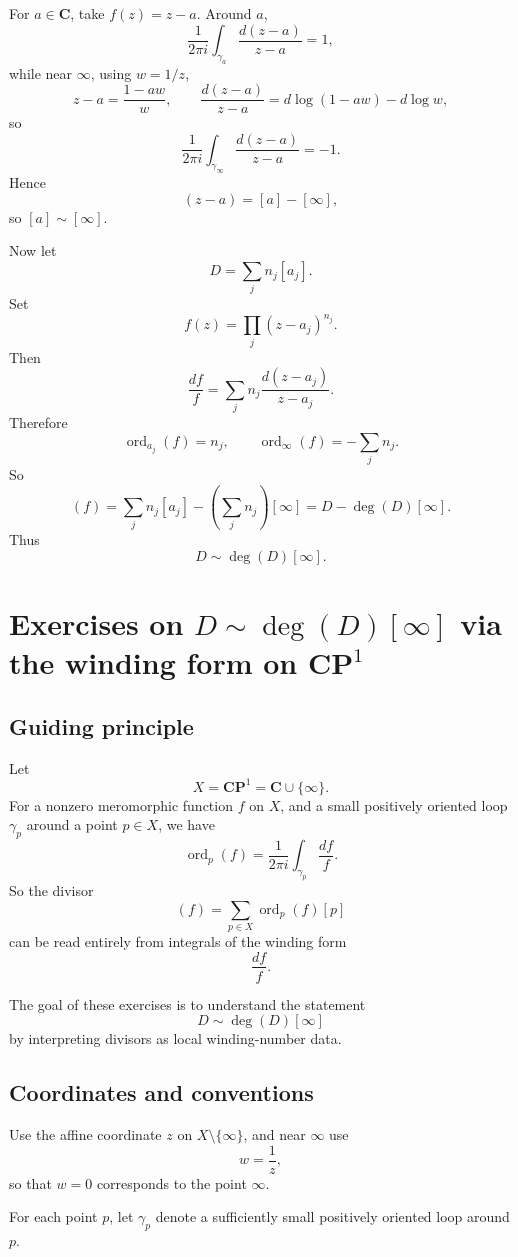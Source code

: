 \documentclass[11pt]{article}
\begin{document}
	For $a\in \mathbf{C}$, take $f(z)=z-a$. Around $a$,
	\[
	\frac{1}{2\pi i}\int_{\gamma_a}\frac{d(z-a)}{z-a}=1,
	\]
	while near $\infty$, using $w=1/z$,
	\[
	z-a=\frac{1-aw}{w},
	\qquad
	\frac{d(z-a)}{z-a}=d\log(1-aw)-d\log w,
	\]
	so
	\[
	\frac{1}{2\pi i}\int_{\gamma_\infty}\frac{d(z-a)}{z-a}=-1.
	\]
	Hence
	\[
	(z-a)=[a]-[\infty],
	\]
	so $[a]\sim [\infty]$.
	
	Now let
	\[
	D=\sum_j n_j[a_j].
	\]
	Set
	\[
	f(z)=\prod_j (z-a_j)^{n_j}.
	\]
	Then
	\[
	\frac{df}{f}=\sum_j n_j\frac{d(z-a_j)}{z-a_j}.
	\]
	Therefore
	\[
	\operatorname{ord}_{a_j}(f)=n_j,
	\qquad
	\operatorname{ord}_\infty(f)=-\sum_j n_j.
	\]
	So
	\[
	(f)=\sum_j n_j[a_j]-\left(\sum_j n_j\right)[\infty]
	= D-\deg(D)[\infty].
	\]
	Thus
	\[
	D\sim \deg(D)[\infty].
	\]
	
	\newpage
	\section*{Exercises on \texorpdfstring{$D\sim \deg(D)[\infty]$}{D~deg(D)[infinity]} via the winding form on \texorpdfstring{$\mathbf{CP}^1$}{CP1}}
	
	\subsection*{Guiding principle}
	
	Let
	\[
	X=\mathbf{CP}^1=\mathbf{C}\cup\{\infty\}.
	\]
	For a nonzero meromorphic function \(f\) on \(X\), and a small positively oriented loop \(\gamma_p\) around a point \(p\in X\), we have
	\[
	\operatorname{ord}_p(f)=\frac{1}{2\pi i}\int_{\gamma_p}\frac{df}{f}.
	\]
	So the divisor
	\[
	(f)=\sum_{p\in X}\operatorname{ord}_p(f)[p]
	\]
	can be read entirely from integrals of the winding form
	\[
	\frac{df}{f}.
	\]
	
	The goal of these exercises is to understand the statement
	\[
	D\sim \deg(D)[\infty]
	\]
	by interpreting divisors as local winding-number data.
	
	\subsection*{Coordinates and conventions}
	
	Use the affine coordinate \(z\) on \(X\setminus\{\infty\}\), and near \(\infty\) use
	\[
	w=\frac{1}{z},
	\]
	so that \(w=0\) corresponds to the point \(\infty\).
	
	For each point \(p\), let \(\gamma_p\) denote a sufficiently small positively oriented loop around \(p\).
	
\end{document}

